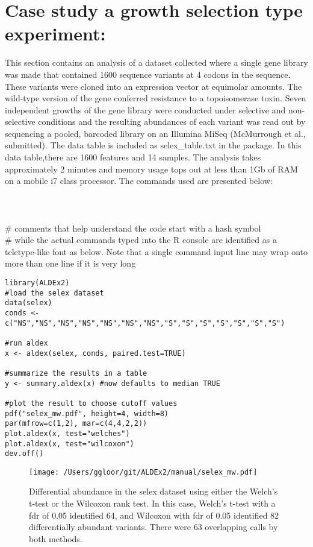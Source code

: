 \documentclass[11pt]{amsart}
\begin{document}
\section{Case study a growth selection type experiment:}{\label{example}} This section contains an analysis of a dataset collected where a single gene  library was made that contained 1600 sequence variants at 4 codons in the sequence. These variants were cloned into an expression vector at equimolar amounts. The wild-type version of the gene conferred resistance to a topoisomerase toxin. Seven independent growths of the gene library were conducted under selective and non-selective conditions and the resulting abundances of each variant was read out by sequencing a pooled, barcoded library on an Illumina MiSeq (McMurrough et al., submitted). The data table is included as selex\_table.txt in the package. In this data table,there are 1600 features and 14 samples. The analysis takes approximately 2 minutes and memory usage tops out at less than 1Gb of RAM on a mobile i7 class processor.  The commands used are presented below:\\\\
\\\\
\noindent \#  comments that help understand the code start with a hash symbol\\

\noindent \# while the actual commands typed into the R console are identified as a teletype-like font as below. Note that a single command input line may wrap onto more than one line if it is very long\\

\begin{verbatim}
library(ALDEx2)
#load the selex dataset
data(selex)
conds <- c("NS","NS","NS","NS","NS","NS","NS","S","S","S","S","S","S","S")

#run aldex
x <- aldex(selex, conds, paired.test=TRUE)

#summarize the results in a table
y <- summary.aldex(x) #now defaults to median TRUE

#plot the result to choose cutoff values
pdf("selex_mw.pdf", height=4, width=8)
par(mfrow=c(1,2), mar=c(4,4,2,2))
plot.aldex(x, test="welches")
plot.aldex(x, test="wilcoxon")
dev.off()
\end{verbatim}
\begin{figure}[!h]
\begin{center}
\texttt{[image: /Users/ggloor/git/ALDEx2/manual/selex\_mw.pdf]}
\caption{Differential abundance in the selex dataset using either the Welch's t-test or the Wilcoxon rank test. In this case, Welch's t-test with a fdr of 0.05 identified 64, and Wilcoxon with fdr of 0.05 identified 82 differentially abundant variants. There were 63 overlapping calls by both methods. }
\label{selex}
\end{center}
\end{figure}
\end{document}
